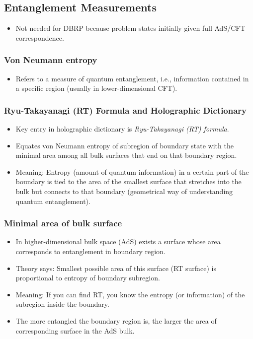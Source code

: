 \documentclass{article}
\begin{document}
\subsection{Entanglement Measurements}
\begin{itemize}
    \item Not needed for DBRP because problem states initially given full AdS/CFT correspondence.
\end{itemize}

\subsubsection*{Von Neumann entropy}
\begin{itemize}
    \item Refers to a measure of quantum entanglement, i.e., information contained in a specific region (usually in lower-dimensional CFT).
\end{itemize}

\subsubsection*{Ryu-Takayanagi (RT) Formula and Holographic Dictionary}
\begin{itemize}
    \item Key entry in holographic dictionary is \textit{Ryu-Takayanagi (RT) formula}.
    \item Equates von Neumann entropy of subregion of boundary state with the minimal area among all bulk surfaces that end on that boundary region.
    \item Meaning: Entropy (amount of quantum information) in a certain part of the boundary is tied to the area of the smallest surface that stretches into the bulk but connects to that boundary (geometrical way of understanding quantum entanglement).
\end{itemize}

\subsubsection*{Minimal area of bulk surface}
\begin{itemize}
    \item In higher-dimensional bulk space (AdS) exists a surface whose area corresponds to entanglement in boundary region.
    \item Theory says: Smallest possible area of this surface (RT surface) is proportional to entropy of boundary subregion.
    \item Meaning: If you can find RT, you know the entropy (or information) of the subregion inside the boundary.
    \item The more entangled the boundary region is, the larger the area of corresponding surface in the AdS bulk.
\end{itemize}
\end{document}
